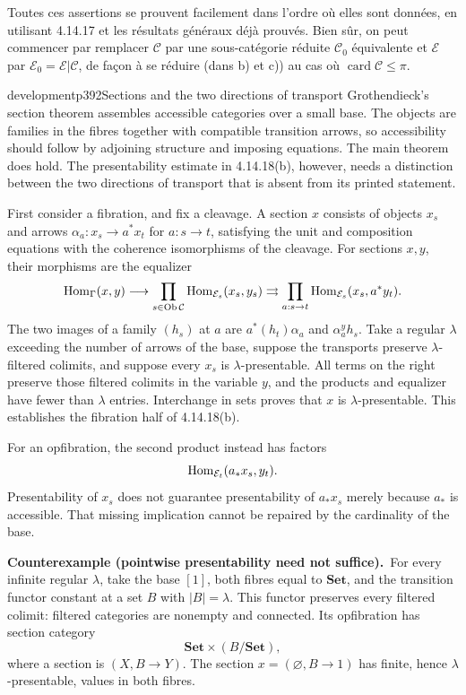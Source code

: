 
Toutes ces assertions se prouvent facilement dans l’ordre où elles sont données, en utilisant 4.14.17 et les résultats généraux déjà prouvés. Bien sûr, on peut commencer par remplacer $\mathcal{C}$ par une sous-catégorie réduite $\mathcal{C}_0$ équivalente et $\mathcal{E}$ par $\mathcal{E}_0 = \mathcal{E}|\mathcal{C}$, de façon à se réduire (dans b) et c)) au cas où $\operatorname{card}\mathcal{C} \leqslant \pi$.

\begin{dcomment}{development}{p392}{Sections and the two directions of transport}
Grothendieck's section theorem assembles accessible categories over a small base. The objects are families in the fibres together with compatible transition arrows, so accessibility should follow by adjoining structure and imposing equations. The main theorem does hold. The presentability estimate in 4.14.18(b), however, needs a distinction between the two directions of transport that is absent from its printed statement.

First consider a fibration, and fix a cleavage. A section $x$ consists of objects $x_s$ and arrows $\alpha_a:x_s\to a^*x_t$ for $a:s\to t$, satisfying the unit and composition equations with the coherence isomorphisms of the cleavage. For sections $x,y$, their morphisms are the equalizer
\[
 \operatorname{Hom}_{\Gamma}(x,y)\longrightarrow
 \prod_{s\in\operatorname{Ob}\mathcal C}\operatorname{Hom}_{\mathcal E_s}(x_s,y_s)
 \rightrightarrows
 \prod_{a:s\to t}\operatorname{Hom}_{\mathcal E_s}(x_s,a^*y_t).
\]
The two images of a family $(h_s)$ at $a$ are $a^*(h_t)\alpha_a$ and $\alpha_a^y h_s$. Take a regular $\lambda$ exceeding the number of arrows of the base, suppose the transports preserve $\lambda$-filtered colimits, and suppose every $x_s$ is $\lambda$-presentable. All terms on the right preserve those filtered colimits in the variable $y$, and the products and equalizer have fewer than $\lambda$ entries. Interchange in sets proves that $x$ is $\lambda$-presentable. This establishes the fibration half of 4.14.18(b).

For an opfibration, the second product instead has factors
\[
 \operatorname{Hom}_{\mathcal E_t}(a_*x_s,y_t).
\]
Presentability of $x_s$ does not guarantee presentability of $a_*x_s$ merely because $a_*$ is accessible. That missing implication cannot be repaired by the cardinality of the base.

\textbf{Counterexample (pointwise presentability need not suffice).}\ours\ 
For every infinite regular $\lambda$, take the base $[1]$, both fibres equal to $\mathbf{Set}$, and the transition functor constant at a set $B$ with $|B|=\lambda$. This functor preserves every filtered colimit: filtered categories are nonempty and connected. Its opfibration has section category
\[
 \mathbf{Set}\times(B/\mathbf{Set}),
\]
where a section is $(X,B\to Y)$. The section $x=(\varnothing,B\to1)$ has finite, hence $\lambda$-presentable, values in both fibres.


\end{dcomment}
